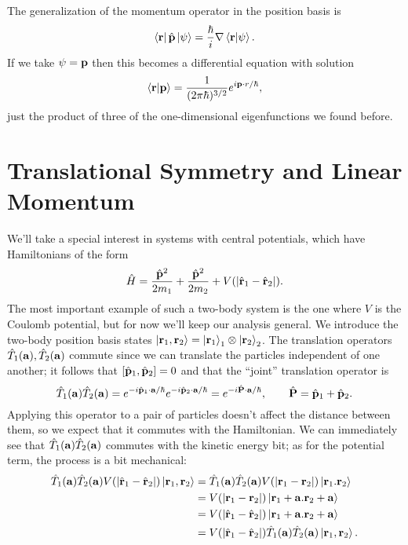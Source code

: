 \documentclass[../p116main.tex]{subfiles}
\begin{document}
The generalization of the momentum operator in the position basis is
\[ \left< \mathbf{r} \right| \hat{\mathbf{p}} \left| \psi \right> = \frac{\hbar}{i} \nabla \left< \mathbf{r} \middle| \psi \right>. \]
If we take $\psi = \mathbf{p}$ then this becomes a differential equation with solution
\[ \left< \mathbf{r} \middle| \mathbf{p} \right> = \frac{1}{(2\pi \hbar)^{3 / 2}} e^{i \mathbf{p} \cdot r / \hbar}, \]
just the product of three of the one-dimensional eigenfunctions we found before.

\section{Translational Symmetry and Linear Momentum}
We'll take a special interest in systems with central potentials, which have Hamiltonians of the form
\[ \hat H = \frac{\hat{\mathbf{p}}^2}{2m_1} + \frac{\hat{\mathbf{p}}^2}{2m_2} + V(|\hat{\mathbf{r}}_1 - \hat{\mathbf{r}}_2|). \]
The most important example of such a two-body system is the one where $V$ is the Coulomb potential, but for now we'll keep our analysis general.
We introduce the two-body position basis states $\left| \mathbf{r}_1, \mathbf{r}_2 \right> = \left| \mathbf{r}_1 \right>_1 \otimes \left| \mathbf{r}_2 \right>_2$.
The translation operators $\hat T_1(\mathbf{a}), \hat T_2(\mathbf{a})$ commute since we can translate the particles independent of one another; it follows that $[\hat{\mathbf{p}}_1, \hat{\mathbf{p}}_2] = 0$ and that the ``joint'' translation operator is
\[ \hat T_1(\mathbf{a}) \hat T_2(\mathbf{a}) = e^{-i \hat{\mathbf{p}}_1 \cdot \mathbf{a} / \hbar} e^{-i \hat{\mathbf{p}}_2 \cdot \mathbf{a} / \hbar} = e^{-i \hat{\mathbf{P}} \cdot \mathbf{a} / \hbar}, \qquad \hat{\mathbf{P}} = \hat{\mathbf{p}}_1 + \hat{\mathbf{p}}_2. \]
Applying this operator to a pair of particles doesn't affect the distance between them, so we expect that it commutes with the Hamiltonian.
We can immediately see that $\hat T_1(\mathbf{a}) \hat T_2(\mathbf{a})$ commutes with the kinetic energy bit; as for the potential term, the process is a bit mechanical:
\begin{align*}
    \hat T_1(\mathbf{a}) \hat T_2(\mathbf{a}) V(|\hat{\mathbf{r}}_1 - \hat{\mathbf{r}}_2|) \left| \mathbf{r}_1, \mathbf{r}_2 \right> &= \hat T_1(\mathbf{a}) \hat T_2(\mathbf{a}) V(|\mathbf{r}_1 - \mathbf{r}_2|) \left| \mathbf{r}_1. \mathbf{r}_2 \right> \\
    &= V(|\mathbf{r}_1 - \mathbf{r}_2|) \left| \mathbf{r}_1 + \mathbf{a}. \mathbf{r}_2 + \mathbf{a} \right> \\
    &= V(|\hat{\mathbf{r}}_1 - \hat{\mathbf{r}}_2|) \left| \mathbf{r}_1 + \mathbf{a}. \mathbf{r}_2 + \mathbf{a} \right> \\
    &= V(|\hat{\mathbf{r}}_1 - \hat{\mathbf{r}}_2|) \hat T_1(\mathbf{a}) \hat T_2(\mathbf{a}) \left| \mathbf{r}_1, \mathbf{r}_2 \right>.
\end{align*}
\end{document}
